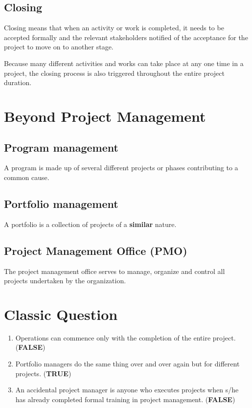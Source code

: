 \documentclass[math,code]{amznotes}
\theoremstyle{remark}
\begin{document}
\subsection{Closing}
Closing means that when an activity or work is completed, it needs to be accepted formally and the relevant stakeholders notified of the acceptance for the project to move on to another stage.

Because many different activities and works can take place at any one time in a project, the closing process is also triggered throughout the entire project duration.

\section{Beyond Project Management}
\subsection{Program management}
A program is made up of several different projects or phases contributing to a common cause.

\subsection{Portfolio management}
A portfolio is a collection of projects of a \textbf{similar} nature.

\subsection{Project Management Office (PMO)}
The project management office serves to manage, organize and control all projects undertaken by the organization.

\section{Classic Question}
\begin{enumerate}
    \item Operations can commence only with the completion of the entire project. (\textbf{FALSE})
    \item Portfolio managers do the same thing over and over again but for different projects. (\textbf{TRUE})
    \item An accidental project manager is anyone who executes projects when s/he has already completed formal training in project management. (\textbf{FALSE})
\end{enumerate}
\end{document}
